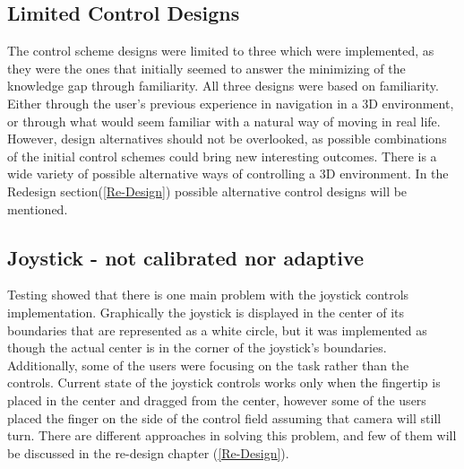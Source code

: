 \subsection*{Limited Control Designs} 
The control scheme designs were limited to three which were implemented, as they were the ones that initially seemed to answer the minimizing of the knowledge gap through familiarity. All three designs were based on familiarity. Either through the user's previous experience in navigation in a 3D environment, or through what would seem familiar with a natural way of moving in real life. However, design alternatives should not be overlooked, as possible combinations of the initial control schemes could bring new interesting outcomes. There is a wide variety of possible alternative ways of controlling a 3D environment. In the Redesign section(\ref{Re-Design}) possible alternative control designs will be mentioned.

\subsection*{Joystick - not calibrated nor adaptive}
Testing showed that there is one main problem with the joystick controls implementation. Graphically the joystick is displayed in the center of its boundaries that are represented as a white circle, but it was implemented as though the actual center is in the corner of the joystick’s boundaries. Additionally, some of the users were focusing on the task rather than the controls. Current state of the joystick controls works only when the fingertip is placed in the center and dragged from the center, however some of the users placed the finger on the side of the control field assuming that camera will still turn. There are different approaches in solving this problem, and few of them will be discussed in the re-design chapter (\ref{Re-Design}). 

